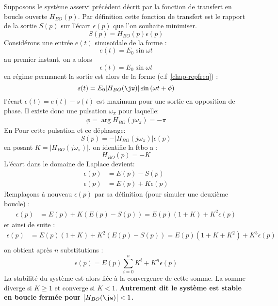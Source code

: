 Supposons le système asservi précédent décrit par la fonction de transfert 
en boucle ouverte $H_{BO}(p)$. Par définition cette fonction de transfert 
est le rapport de la sortie $S(p)$ sur l'écart $\epsilon(p)$ que l'on 
souhaite minimiser.
\[
    S(p)=H_{BO}(p)\epsilon(p)
\]
Considérons une entrée $e(t)$ sinuso\"idale de la forme :
\[
    e(t)=E_0\sin{\omega t}
\]
au premier instant, on a alors 
\[
    \epsilon(t)=E_0\sin{\omega t}
\]
en régime permanent la sortie est alors de la forme (c.f~\cref{chap-repfreq}) :
\[
    s(t)=E_0|H_{BO}(\jw)|\sin{(\omega t+\phi)}
\]
l'écart $\epsilon(t)=e(t)-s(t)$ est maximum pour une sortie en opposition 
de phase. Il existe donc une pulsation $\omega_\pi$ pour laquelle:
\begin{align*}
    \phi=\arg{H_{BO}(j\omega_\pi)}=-\pi
\end{align*}
En Pour cette pulsation et ce déphasage: 
\[
    S(p)=-\big|H_{BO}(j\omega_\pi)\big|\epsilon(p)
\]
en posant $K=|H_{BO}(j\omega_\pi)|$, on identifie la \gls{ftbo} a :
\[
    H_{BO}(p)=-K
\]
L'écart dans le domaine de Laplace devient:
\begin{align*}
    \epsilon(p)&=E(p)-S(p)\\
    \epsilon(p)&=E(p)+K\epsilon(p)
\end{align*}
Remplaçons à nouveau $\epsilon(p)$ par sa définition (pour simuler une 
deuxième boucle) : 
\begin{align*}
    \epsilon(p)&=E(p)+K(E(p)-S(p))=E(p)(1+K)+K^2\epsilon(p)
\end{align*}
et ainsi de suite :
\begin{align*}
    \epsilon(p)&=E(p)(1+K)+K^2\left(E(p)-S(p)\right)
                =E(p)(1+K+K^2)+K^3\epsilon(p)\\
\end{align*}
on obtient après $n$ substitutions :
\[
\epsilon(p)=E(p)\sum_{i=0}^{n}K^i+K^n\epsilon(p)
\]
La stabilité du système est alors liée à la convergence de cette somme.
La somme diverge si $K\geq1$ et converge si $K<1$. 
\textbf{Autrement dit le système est stable en boucle fermée 
pour $\big|H_{BO}(\jw)\big|<1$.}

